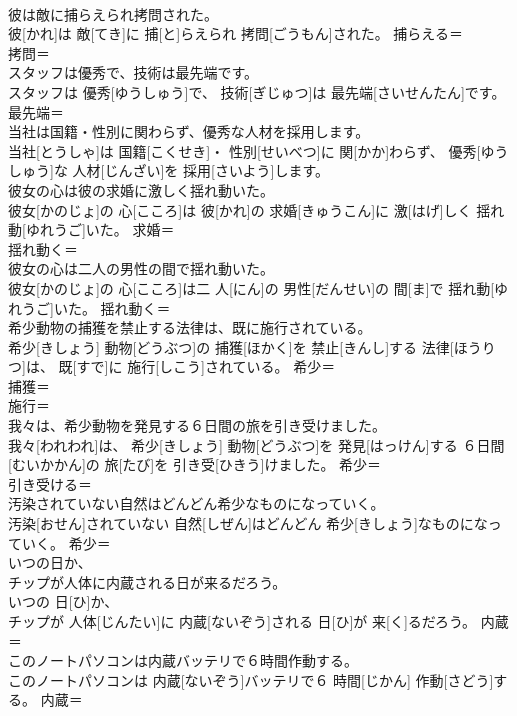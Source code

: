 \documentclass[8pt]{extreport}
\begin{document}
\begin{CJK}{UTF8}{min}
\\	彼は敵に捕らえられ拷問された。	
\\	彼[かれ]は 敵[てき]に 捕[と]らえられ 拷問[ごうもん]された。	捕らえる＝ 
\\	拷問＝ 
\\	スタッフは優秀で、技術は最先端です。	
\\	スタッフは 優秀[ゆうしゅう]で、 技術[ぎじゅつ]は 最先端[さいせんたん]です。	最先端＝ 
\\	当社は国籍・性別に関わらず、優秀な人材を採用します。	
\\	当社[とうしゃ]は 国籍[こくせき]・ 性別[せいべつ]に 関[かか]わらず、 優秀[ゆうしゅう]な 人材[じんざい]を 採用[さいよう]します。	
\\	彼女の心は彼の求婚に激しく揺れ動いた。	
\\	彼女[かのじょ]の 心[こころ]は 彼[かれ]の 求婚[きゅうこん]に 激[はげ]しく 揺れ動[ゆれうご]いた。	求婚＝ 
\\	揺れ動く＝ 
\\	彼女の心は二人の男性の間で揺れ動いた。	
\\	彼女[かのじょ]の 心[こころ]は二 人[にん]の 男性[だんせい]の 間[ま]で 揺れ動[ゆれうご]いた。	揺れ動く＝ 
\\	希少動物の捕獲を禁止する法律は、既に施行されている。	
\\	希少[きしょう] 動物[どうぶつ]の 捕獲[ほかく]を 禁止[きんし]する 法律[ほうりつ]は、 既[すで]に 施行[しこう]されている。	希少＝ 
\\	捕獲＝ 
\\	施行＝ 
\\	我々は、希少動物を発見する６日間の旅を引き受けました。	
\\	我々[われわれ]は、 希少[きしょう] 動物[どうぶつ]を 発見[はっけん]する ６日間[むいかかん]の 旅[たび]を 引き受[ひきう]けました。	希少＝ 
\\	引き受ける＝ 
\\	汚染されていない自然はどんどん希少なものになっていく。	
\\	汚染[おせん]されていない 自然[しぜん]はどんどん 希少[きしょう]なものになっていく。	希少＝ 
\\	いつの日か、
\\	チップが人体に内蔵される日が来るだろう。	
\\	いつの 日[ひ]か、 
\\	チップが 人体[じんたい]に 内蔵[ないぞう]される 日[ひ]が 来[く]るだろう。	内蔵＝ 
\\	このノートパソコンは内蔵バッテリで６時間作動する。	
\\	このノートパソコンは 内蔵[ないぞう]バッテリで６ 時間[じかん] 作動[さどう]する。	内蔵＝ 

\end{CJK}
\end{document}
